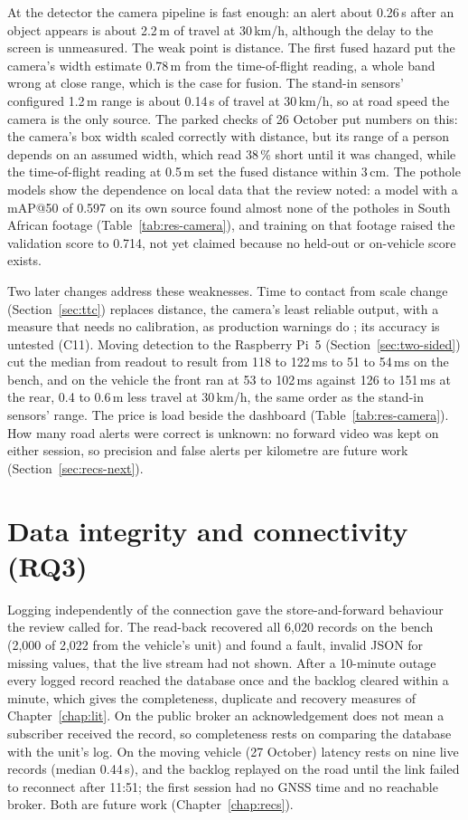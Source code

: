 At the detector the camera pipeline is fast enough: an alert about 0.26\,s after an object appears is about 2.2\,m of travel at 30\,km/h, although the delay to the screen is unmeasured. The weak point is distance. The first fused hazard put the camera's width estimate 0.78\,m from the time-of-flight reading, a whole band wrong at close range, which is the case for fusion. The stand-in sensors' configured 1.2\,m range is about 0.14\,s of travel at 30\,km/h, so at road speed the camera is the only source. The parked checks of 26 October put numbers on this: the camera's box width scaled correctly with distance, but its range of a person depends on an assumed width, which read 38\,\% short until it was changed, while the time-of-flight reading at 0.5\,m set the fused distance within 3\,cm. The pothole models show the dependence on local data that the review noted: a model with a mAP@50 of 0.597 on its own source found almost none of the potholes in South African footage (Table~\ref{tab:res-camera}), and training on that footage raised the validation score to 0.714, not yet claimed because no held-out or on-vehicle score exists.

Two later changes address these weaknesses. Time to contact from scale change (Section~\ref{sec:ttc}) replaces distance, the camera's least reliable output, with a measure that needs no calibration, as production warnings do \cite{dagan2004fcw}; its accuracy is untested (C11). Moving detection to the Raspberry Pi~5 (Section~\ref{sec:two-sided}) cut the median from readout to result from 118 to 122\,ms to 51 to 54\,ms on the bench, and on the vehicle the front ran at 53 to 102\,ms against 126 to 151\,ms at the rear, 0.4 to 0.6\,m less travel at 30\,km/h, the same order as the stand-in sensors' range. The price is load beside the dashboard (Table~\ref{tab:res-camera}). How many road alerts were correct is unknown: no forward video was kept on either session, so precision and false alerts per kilometre are future work (Section~\ref{sec:recs-next}).

\section{Data integrity and connectivity (RQ3)}
\label{sec:disc-data}

Logging independently of the connection gave the store-and-forward behaviour the review called for. The read-back recovered all 6,020 records on the bench (2,000 of 2,022 from the vehicle's unit) and found a fault, invalid JSON for missing values, that the live stream had not shown. After a 10-minute outage every logged record reached the database once and the backlog cleared within a minute, which gives the completeness, duplicate and recovery measures of Chapter~\ref{chap:lit}. On the public broker an acknowledgement does not mean a subscriber received the record, so completeness rests on comparing the database with the unit's log. On the moving vehicle (27 October) latency rests on nine live records (median 0.44\,s), and the backlog replayed on the road until the link failed to reconnect after 11:51; the first session had no GNSS time and no reachable broker. Both are future work (Chapter~\ref{chap:recs}).

